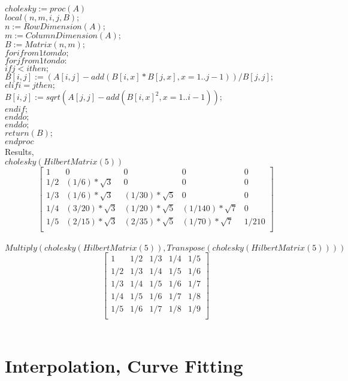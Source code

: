 \documentclass[12pt]{article}
\begin{document}
$cholesky:=proc(A)$\\
$local(n, m, i, j, B);$\\
$n := RowDimension(A);$\\
$m := ColumnDimension(A);$\\
$B := Matrix(n, m);$\\
$ for i from 1 to m do;$\\
$for j from 1 to n do:$\\
$ if j<i then;$\\
$B[i, j] := (A[i, j]-add(B[i, x]*B[j, x], x = 1 .. j-1))/B[j, j];$\\
$elif i= j then;$\\
$B[i, j] := sqrt(A[j, j]-add(B[i, x]^2, x = 1 .. i-1));$\\
$end if;$\\
$end do;$\\
$end do;$\\
$return(B);$\\
$end proc$\\

Results,\\
$cholesky(HilbertMatrix(5))$\\
$$\begin{bmatrix}
1 & 0 & 0 & 0 & 0\\
1/2 & (1/6)*\sqrt{3} & 0 & 0 & 0\\
1/3 & (1/6)*\sqrt{3} & (1/30)*\sqrt{5} & 0 & 0\\
1/4 & (3/20)*\sqrt{3} & (1/20)*\sqrt{5}  & (1/140)*\sqrt{7}  & 0\\
1/5 & (2/15)*\sqrt{3} & (2/35)*\sqrt{5}  & (1/70)*\sqrt{7}  & 1/210\\
\end{bmatrix}$$\\

$Multiply(cholesky(HilbertMatrix(5)), Transpose(cholesky(HilbertMatrix(5))))$\\
$$\begin{bmatrix}
1 & 1/2 & 1/3 & 1/4 & 1/5\\
1/2 & 1/3 & 1/4 & 1/5 & 1/6\\
1/3 & 1/4 & 1/5 & 1/6 & 1/7\\
1/4 & 1/5 & 1/6  & 1/7  & 1/8\\
1/5 & 1/6 & 1/7  & 1/8  & 1/9\\
\end{bmatrix}$$\\
\section{Interpolation, Curve Fitting}
\end{document}
